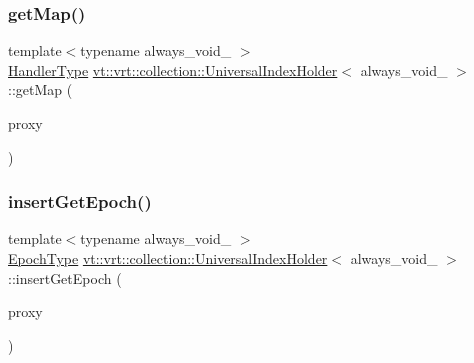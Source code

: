\subsubsection{\texorpdfstring{get\+Map()}{getMap()}}
{\footnotesize\ttfamily template$<$typename always\+\_\+void\+\_\+ $>$ \\
\hyperlink{namespacevt_af64846b57dfcaf104da3ef6967917573}{Handler\+Type} \hyperlink{structvt_1_1vrt_1_1collection_1_1_universal_index_holder}{vt\+::vrt\+::collection\+::\+Universal\+Index\+Holder}$<$ always\+\_\+void\+\_\+ $>$\+::get\+Map (\begin{DoxyParamCaption}\item[{\hyperlink{namespacevt_a1b417dd5d684f045bb58a0ede70045ac}{Virtual\+Proxy\+Type} const}]{proxy }\end{DoxyParamCaption})\hspace{0.3cm}{\ttfamily [static]}}

\mbox{\label{structvt_1_1vrt_1_1collection_1_1_universal_index_holder_a45b646ebb0be1787d3893f4e719ed031}} 
\subsubsection{\texorpdfstring{insert\+Get\+Epoch()}{insertGetEpoch()}}
{\footnotesize\ttfamily template$<$typename always\+\_\+void\+\_\+ $>$ \\
\hyperlink{namespacevt_a985a5adf291c34a3ca263b3378388236}{Epoch\+Type} \hyperlink{structvt_1_1vrt_1_1collection_1_1_universal_index_holder}{vt\+::vrt\+::collection\+::\+Universal\+Index\+Holder}$<$ always\+\_\+void\+\_\+ $>$\+::insert\+Get\+Epoch (\begin{DoxyParamCaption}\item[{\hyperlink{namespacevt_a1b417dd5d684f045bb58a0ede70045ac}{Virtual\+Proxy\+Type} const}]{proxy }\end{DoxyParamCaption})\hspace{0.3cm}{\ttfamily [static]}}

\mbox{\label{structvt_1_1vrt_1_1collection_1_1_universal_index_holder_a6da9bb8383de73588d8b8379dcab22e4}} 
